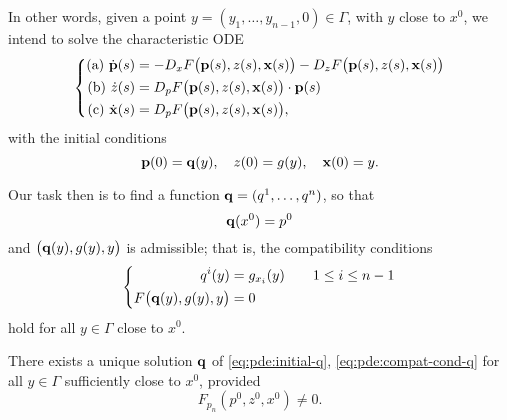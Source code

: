 In other words, given a point \(y=(y_1,\dotsc,y_{n-1},0)\in\Gamma\), with
\(y\) close to \(x^0\), we intend to solve the characteristic ODE
\begin{equation}
  \label{eq:pde:chars-2}
  \left\{
    \begin{aligned}
      \text{(a) }\dot{\mathbf{p}}(s)
      &=-D_xF\bigl(\mathbf{p}(s),z(s),\mathbf{x}(s)\bigr)
      -D_zF\bigl(\mathbf{p}(s),z(s),\mathbf{x}(s)\bigr)\\
      \text{(b) }\dot z(s)&=D_pF\bigl(\mathbf{p}(s),z(s),\mathbf{x}(s)\bigr)\cdot\mathbf{p}(s)\\
      \text{(c) }\dot{\mathbf{x}}(s)&=D_pF\bigl(\mathbf{p}(s),z(s),\mathbf{x}(s)\bigr),
    \end{aligned}
  \right.
\end{equation}
with the initial conditions
\begin{equation}
  \label{eq:pde:initial-cond-2}
  \mathbf{p}(0)=\mathbf{q}(y),\quad z(0)=g(y),\quad\mathbf{x}(0)=y.
\end{equation}

Our task then is to find a function \(\mathbf{q}=(q^1,\dotsc,q^n)\), so that
\begin{equation}
  \label{eq:pde:initial-q}
  \mathbf{q}(x^0)=p^0
\end{equation}
and \(\bigl(\mathbf{q}(y),g(y),y\bigr)\) is admissible; that is, the
compatibility conditions
\begin{equation}
  \label{eq:pde:compat-cond-q}
  \left\{
    \begin{aligned}
      q^i(y)&=g_{x_i}(y)\qquad 1\leq i\leq n-1\\
      F\bigl( \mathbf{q}(y),g(y),y \bigr)&=0
    \end{aligned}
  \right.
\end{equation}
hold for all \(y\in\Gamma\) close to \(x^0\).

\begin{lemma}
  There exists a unique solution \(\mathbf{q}\) of \eqref{eq:pde:initial-q},
  \eqref{eq:pde:compat-cond-q} for all \(y\in\Gamma\) sufficiently close to
  \(x^0\), provided
  \begin{equation}
    \label{eq:pde:nonchar-cond}
    F_{p_n}(p^0,z^0,x^0)\neq 0.
  \end{equation}
\end{lemma}

